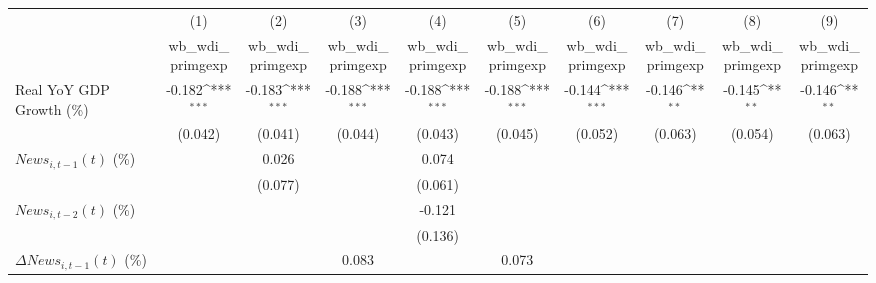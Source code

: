 {
\def\sym#1{\ifmmode^{#1}\else\(^{#1}\)\fi}
\begin{tabular}{l*{9}{c}}
\toprule
                    &\multicolumn{1}{c}{(1)}&\multicolumn{1}{c}{(2)}&\multicolumn{1}{c}{(3)}&\multicolumn{1}{c}{(4)}&\multicolumn{1}{c}{(5)}&\multicolumn{1}{c}{(6)}&\multicolumn{1}{c}{(7)}&\multicolumn{1}{c}{(8)}&\multicolumn{1}{c}{(9)}\\
                    &\multicolumn{1}{c}{wb_wdi_primgexp}&\multicolumn{1}{c}{wb_wdi_primgexp}&\multicolumn{1}{c}{wb_wdi_primgexp}&\multicolumn{1}{c}{wb_wdi_primgexp}&\multicolumn{1}{c}{wb_wdi_primgexp}&\multicolumn{1}{c}{wb_wdi_primgexp}&\multicolumn{1}{c}{wb_wdi_primgexp}&\multicolumn{1}{c}{wb_wdi_primgexp}&\multicolumn{1}{c}{wb_wdi_primgexp}\\
\midrule
Real YoY GDP Growth (\%)&      -0.182\sym{***}&      -0.183\sym{***}&      -0.188\sym{***}&      -0.188\sym{***}&      -0.188\sym{***}&      -0.144\sym{***}&      -0.146\sym{**} &      -0.145\sym{**} &      -0.146\sym{**} \\
                    &     (0.042)         &     (0.041)         &     (0.044)         &     (0.043)         &     (0.045)         &     (0.052)         &     (0.063)         &     (0.054)         &     (0.063)         \\
\addlinespace
$ News_{i,t-1}(t)$ (\%)&                     &       0.026         &                     &       0.074         &                     &                     &                     &                     &                     \\
                    &                     &     (0.077)         &                     &     (0.061)         &                     &                     &                     &                     &                     \\
\addlinespace
$ News_{i,t-2}(t)$ (\%)&                     &                     &                     &      -0.121         &                     &                     &                     &                     &                     \\
                    &                     &                     &                     &     (0.136)         &                     &                     &                     &                     &                     \\
\addlinespace
$ \Delta News_{i,t-1}(t)$ (\%)&                     &                     &       0.083         &                     &       0.073         &                     &                     &                     &                     \\

\end{tabular}}
